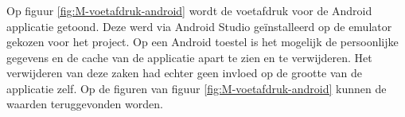 \subsubsection{}
\label{sec:M-test-voetafdruk-android}
Op figuur \ref{fig:M-voetafdruk-android} wordt de voetafdruk voor de Android applicatie getoond. Deze werd via Android Studio geïnstalleerd op de emulator gekozen voor het project. Op een Android toestel is het mogelijk de persoonlijke gegevens en de cache van de applicatie apart te zien en te verwijderen. Het verwijderen van deze zaken had echter geen invloed op de grootte van de applicatie zelf. Op de figuren van figuur \ref{fig:M-voetafdruk-android} kunnen de waarden teruggevonden worden.

\begin{figure}
    \centering
    \qquad
    

\end{figure}

